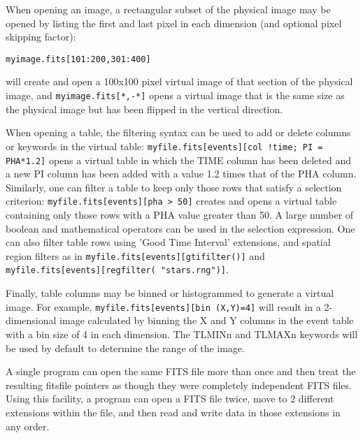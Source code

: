 \documentclass[11pt]{book}
\begin{document}
\begin{description}
When opening an image, a rectangular subset of the physical image may be
opened by listing the first and last pixel in each dimension (and
optional pixel skipping factor):

\begin{verbatim}
myimage.fits[101:200,301:400]
\end{verbatim}
will create and open a 100x100 pixel virtual image of that section of
the physical image, and \verb+myimage.fits[*,-*]+ opens a virtual image
that is the same size as the physical image but has been flipped in
the vertical direction.

When opening a table, the filtering syntax can be used to add or delete
columns or keywords in the virtual table:
\verb-myfile.fits[events][col !time; PI = PHA*1.2]- opens a virtual table in which the TIME column
has been deleted and a new PI column has been added with a value 1.2
times that of the PHA column. Similarly, one can filter a table to keep
only those rows that satisfy a selection criterion:
\verb-myfile.fits[events][pha > 50]- creates and opens a virtual table
containing only those rows with a PHA value greater than 50. A large
number of boolean and mathematical operators can be used in the
selection expression. One can also filter table rows using 'Good Time
Interval' extensions, and spatial region filters as in
\verb-myfile.fits[events][gtifilter()]- and
\verb-myfile.fits[events][regfilter( "stars.rng")]-.

Finally, table columns may be binned or histogrammed to generate a
virtual image. For example, \verb-myfile.fits[events][bin (X,Y)=4]- will
result in a 2-dimensional image calculated by binning the X and Y
columns in the event table with a bin size of 4 in each dimension. The
TLMINn and TLMAXn keywords will be used by default to determine the
range of the image.

A single program can open the same FITS file more than once and then
treat the resulting fitsfile pointers as though they were completely
independent FITS files. Using this facility, a program can open a FITS
file twice, move to 2 different extensions within the file, and then
 read and write data in those extensions in any order.
\end{description}
\end{document}
